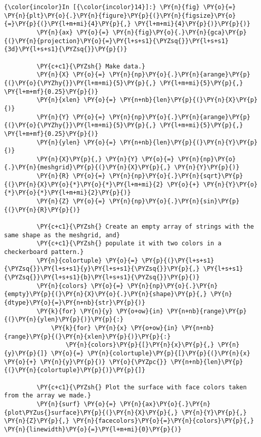     \begin{Verbatim}[commandchars=\\\{\},frame=single,framerule=0.3mm,rulecolor=\color{cellframecolor}]
{\color{incolor}In [{\color{incolor}14}]:} \PY{n}{fig} \PY{o}{=} \PY{n}{plt}\PY{o}{.}\PY{n}{figure}\PY{p}{(}\PY{n}{figsize}\PY{o}{=}\PY{p}{(}\PY{l+m+mi}{4}\PY{p}{,} \PY{l+m+mi}{4}\PY{p}{)}\PY{p}{)}
         \PY{n}{ax} \PY{o}{=} \PY{n}{fig}\PY{o}{.}\PY{n}{gca}\PY{p}{(}\PY{n}{projection}\PY{o}{=}\PY{l+s+s1}{\PYZsq{}}\PY{l+s+s1}{3d}\PY{l+s+s1}{\PYZsq{}}\PY{p}{)}
         
         \PY{c+c1}{\PYZsh{} Make data.}
         \PY{n}{X} \PY{o}{=} \PY{n}{np}\PY{o}{.}\PY{n}{arange}\PY{p}{(}\PY{o}{\PYZhy{}}\PY{l+m+mi}{5}\PY{p}{,} \PY{l+m+mi}{5}\PY{p}{,} \PY{l+m+mf}{0.25}\PY{p}{)}
         \PY{n}{xlen} \PY{o}{=} \PY{n+nb}{len}\PY{p}{(}\PY{n}{X}\PY{p}{)}
         \PY{n}{Y} \PY{o}{=} \PY{n}{np}\PY{o}{.}\PY{n}{arange}\PY{p}{(}\PY{o}{\PYZhy{}}\PY{l+m+mi}{5}\PY{p}{,} \PY{l+m+mi}{5}\PY{p}{,} \PY{l+m+mf}{0.25}\PY{p}{)}
         \PY{n}{ylen} \PY{o}{=} \PY{n+nb}{len}\PY{p}{(}\PY{n}{Y}\PY{p}{)}
         \PY{n}{X}\PY{p}{,} \PY{n}{Y} \PY{o}{=} \PY{n}{np}\PY{o}{.}\PY{n}{meshgrid}\PY{p}{(}\PY{n}{X}\PY{p}{,} \PY{n}{Y}\PY{p}{)}
         \PY{n}{R} \PY{o}{=} \PY{n}{np}\PY{o}{.}\PY{n}{sqrt}\PY{p}{(}\PY{n}{X}\PY{o}{*}\PY{o}{*}\PY{l+m+mi}{2} \PY{o}{+} \PY{n}{Y}\PY{o}{*}\PY{o}{*}\PY{l+m+mi}{2}\PY{p}{)}
         \PY{n}{Z} \PY{o}{=} \PY{n}{np}\PY{o}{.}\PY{n}{sin}\PY{p}{(}\PY{n}{R}\PY{p}{)}
         
         \PY{c+c1}{\PYZsh{} Create an empty array of strings with the same shape as the meshgrid, and}
         \PY{c+c1}{\PYZsh{} populate it with two colors in a checkerboard pattern.}
         \PY{n}{colortuple} \PY{o}{=} \PY{p}{(}\PY{l+s+s1}{\PYZsq{}}\PY{l+s+s1}{y}\PY{l+s+s1}{\PYZsq{}}\PY{p}{,} \PY{l+s+s1}{\PYZsq{}}\PY{l+s+s1}{b}\PY{l+s+s1}{\PYZsq{}}\PY{p}{)}
         \PY{n}{colors} \PY{o}{=} \PY{n}{np}\PY{o}{.}\PY{n}{empty}\PY{p}{(}\PY{n}{X}\PY{o}{.}\PY{n}{shape}\PY{p}{,} \PY{n}{dtype}\PY{o}{=}\PY{n+nb}{str}\PY{p}{)}
         \PY{k}{for} \PY{n}{y} \PY{o+ow}{in} \PY{n+nb}{range}\PY{p}{(}\PY{n}{ylen}\PY{p}{)}\PY{p}{:}
             \PY{k}{for} \PY{n}{x} \PY{o+ow}{in} \PY{n+nb}{range}\PY{p}{(}\PY{n}{xlen}\PY{p}{)}\PY{p}{:}
                 \PY{n}{colors}\PY{p}{[}\PY{n}{x}\PY{p}{,} \PY{n}{y}\PY{p}{]} \PY{o}{=} \PY{n}{colortuple}\PY{p}{[}\PY{p}{(}\PY{n}{x} \PY{o}{+} \PY{n}{y}\PY{p}{)} \PY{o}{\PYZpc{}} \PY{n+nb}{len}\PY{p}{(}\PY{n}{colortuple}\PY{p}{)}\PY{p}{]}
         
         \PY{c+c1}{\PYZsh{} Plot the surface with face colors taken from the array we made.}
         \PY{n}{surf} \PY{o}{=} \PY{n}{ax}\PY{o}{.}\PY{n}{plot\PYZus{}surface}\PY{p}{(}\PY{n}{X}\PY{p}{,} \PY{n}{Y}\PY{p}{,} \PY{n}{Z}\PY{p}{,} \PY{n}{facecolors}\PY{o}{=}\PY{n}{colors}\PY{p}{,} \PY{n}{linewidth}\PY{o}{=}\PY{l+m+mi}{0}\PY{p}{)}
         

\end{Verbatim}
